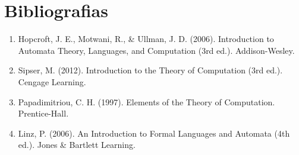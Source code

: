 \chapter{Bibliografias}
\begin{enumerate}
    \item Hopcroft, J. E., Motwani, R., & Ullman, J. D. (2006). Introduction to Automata Theory, Languages, and Computation (3rd ed.). Addison-Wesley.\newline
    \item Sipser, M. (2012). Introduction to the Theory of Computation (3rd ed.). Cengage Learning.\newline
    \item Papadimitriou, C. H. (1997). Elements of the Theory of Computation. Prentice-Hall.\newline
    \item Linz, P. (2006). An Introduction to Formal Languages and Automata (4th ed.). Jones & Bartlett Learning.\newline
\end{enumerate}





